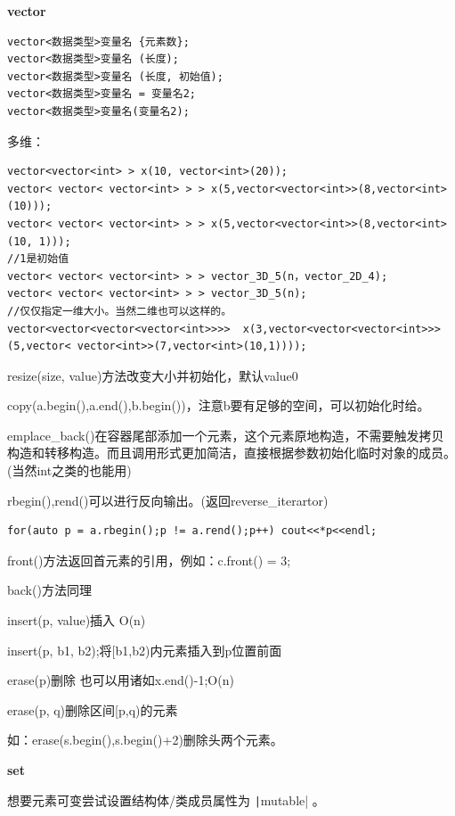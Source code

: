 \documentclass[twocolumn,10pt]{ctexart}
\makeatletter
\newcommand{\hfive}[1]{\par\addvspace{6pt}\@afterindentfalse
  {\noindent\bfseries\normalsize #1}\par\nobreak\vspace{2pt}}
\makeatother
\begin{document}
\hfive{vector}

\begin{verbatim}
vector<数据类型>变量名 {元素数};
vector<数据类型>变量名 (长度);
vector<数据类型>变量名 (长度, 初始值);
vector<数据类型>变量名 = 变量名2;
vector<数据类型>变量名(变量名2);
\end{verbatim}

多维：

\begin{verbatim}
vector<vector<int> > x(10, vector<int>(20));
vector< vector< vector<int> > > x(5,vector<vector<int>>(8,vector<int>(10)));
vector< vector< vector<int> > > x(5,vector<vector<int>>(8,vector<int>(10, 1)));
//1是初始值
vector< vector< vector<int> > > vector_3D_5(n，vector_2D_4);                                   
vector< vector< vector<int> > > vector_3D_5(n);
//仅仅指定一维大小。当然二维也可以这样的。
vector<vector<vector<vector<int>>>>  x(3,vector<vector<vector<int>>>(5,vector< vector<int>>(7,vector<int>(10,1))));
\end{verbatim}

resize(size, value)方法改变大小并初始化，默认value0

copy(a.begin(),a.end(),b.begin())，注意b要有足够的空间，可以初始化时给。

emplace\_back()在容器尾部添加一个元素，这个元素原地构造，不需要触发拷贝构造和转移构造。而且调用形式更加简洁，直接根据参数初始化临时对象的成员。(当然int之类的也能用)

rbegin(),rend()可以进行反向输出。(返回reverse\_iterartor)

\begin{verbatim}
for(auto p = a.rbegin();p != a.rend();p++) cout<<*p<<endl;
\end{verbatim}

front()方法返回首元素的引用，例如：c.front() = 3;

back()方法同理

insert(p, value)插入 O(n)

insert(p, b1, b2);将[b1,b2)内元素插入到p位置前面

erase(p)删除 也可以用诸如x.end()-1;O(n)

erase(p, q)删除区间[p,q)的元素

\begin{notebox}
如：erase(s.begin(),s.begin()+2)删除头两个元素。
\end{notebox}

\hfive{set}

想要元素可变尝试设置结构体/类成员属性为 \texttt|mutable| 。
\end{document}
